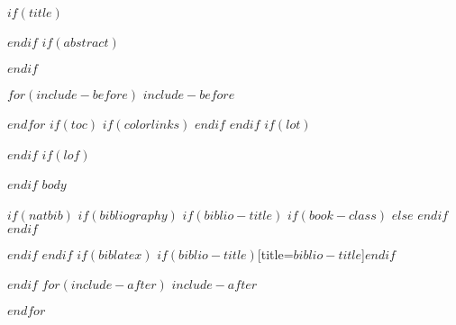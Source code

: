 \documentclass[oneside,final,14pt]{extreport}
\begin{document}
$if(title)$
\maketitle
$endif$
$if(abstract)$
\begin{abstract}
$abstract$
\end{abstract}
$endif$

$for(include-before)$
$include-before$

$endfor$
$if(toc)$
{
$if(colorlinks)$
\hypersetup{linkcolor=$if(toccolor)$$toccolor$$else$black$endif$}
$endif$
\setcounter{tocdepth}{$toc-depth$}
\tableofcontents
}
$endif$
$if(lot)$
\listoftables
$endif$
$if(lof)$
\listoffigures
$endif$
$body$

$if(natbib)$
$if(bibliography)$
$if(biblio-title)$
$if(book-class)$
\renewcommand\bibname{$biblio-title$}
$else$
\renewcommand\refname{$biblio-title$}
$endif$
$endif$


$endif$
$endif$
$if(biblatex)$
\printbibliography$if(biblio-title)$[title=$biblio-title$]$endif$

$endif$
$for(include-after)$
$include-after$

$endfor$
\end{document}
